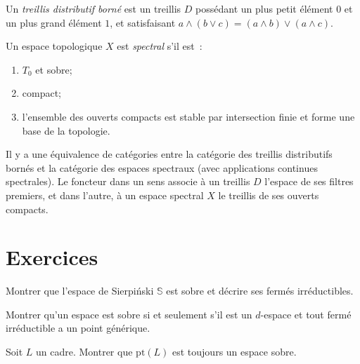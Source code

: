\begin{definition}
Un \emph{treillis distributif born\'e} est un treillis $D$ poss\'edant un plus petit
\'el\'ement $0$ et un plus grand \'el\'ement $1$, et satisfaisant
$a \wedge (b \vee c) = (a \wedge b) \vee (a \wedge c)$.
\end{definition}

\begin{definition}
Un espace topologique $X$ est \emph{spectral} s'il est~:
\begin{enumerate}
  \item $T_0$ et sobre;
  \item compact;
  \item l'ensemble des ouverts compacts est stable par intersection finie et forme une base
    de la topologie.
\end{enumerate}
\end{definition}

\begin{theoreme}
Il y a une \'equivalence de cat\'egories entre la cat\'egorie des treillis distributifs
born\'es et la cat\'egorie des espaces spectraux (avec applications continues spectrales).
Le foncteur dans un sens associe \`a un treillis $D$ l'espace de ses filtres premiers, et
dans l'autre, \`a un espace spectral $X$ le treillis de ses ouverts compacts.
\end{theoreme}

\section{Exercices}

\begin{exercice}
Montrer que l'espace de Sierpi\'nski $\mathbb{S}$ est sobre et d\'ecrire ses ferm\'es
irr\'eductibles.
\end{exercice}

\begin{exercice}
Montrer qu'un espace est sobre si et seulement s'il est un $d$-espace et tout ferm\'e
irr\'eductible a un point g\'en\'erique.
\end{exercice}

\begin{exercice}
Soit $L$ un cadre. Montrer que $\mathrm{pt}(L)$ est toujours un espace sobre.
\end{exercice}

